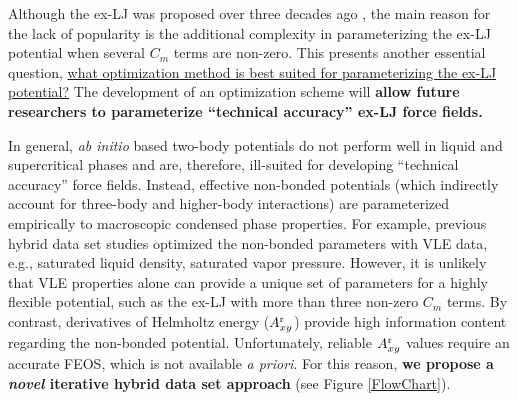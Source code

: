 \documentclass[12pt,a4paper]{article}
\begin{document}



Although the ex-LJ was proposed over three decades ago \cite{Kalos1972}, the main reason for the lack of popularity is the additional complexity in parameterizing the ex-LJ potential when several $C_m$ terms are non-zero. This presents another essential question, \ul{what optimization method is best suited for parameterizing the ex-LJ potential?} The development of an optimization scheme will \textbf{allow future researchers to parameterize ``technical accuracy'' ex-LJ force fields.}

In general, \textit{ab initio} based two-body potentials do not perform well in liquid and supercritical phases and are, therefore, ill-suited for developing ``technical accuracy'' force fields. Instead, effective non-bonded potentials (which indirectly account for three-body and higher-body interactions) are parameterized empirically to macroscopic condensed phase properties. For example, previous hybrid data set studies optimized the non-bonded parameters with VLE data, e.g., saturated liquid density, saturated vapor pressure. However, it is unlikely that VLE properties alone can provide a unique set of parameters for a highly flexible potential, such as the ex-LJ with more than three non-zero $C_m$ terms. By contrast, derivatives of Helmholtz energy ($A_{xy}^{\rm r}$) provide high information content regarding the non-bonded potential. Unfortunately, reliable $A_{xy}^{\rm r}$ values require an accurate FEOS, which is not available \textit{a priori}. For this reason, \textbf{we propose a \textit{novel} iterative hybrid data set approach} (see Figure \ref{FlowChart}).

\end{document}
